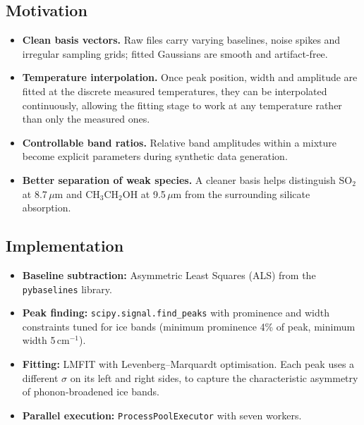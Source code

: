\documentclass[11pt,a4paper]{article}
\newcommand{\um}{\,$\mu$m}
\newcommand{\code}[1]{\texttt{\small #1}}
\begin{document}
\subsection{Motivation}

\begin{itemize}
  \item \textbf{Clean basis vectors.} Raw files carry varying baselines,
        noise spikes and irregular sampling grids; fitted Gaussians are
        smooth and artifact-free.
  \item \textbf{Temperature interpolation.} Once peak position, width and
        amplitude are fitted at the discrete measured temperatures, they
        can be interpolated continuously, allowing the fitting stage to
        work at any temperature rather than only the measured ones.
  \item \textbf{Controllable band ratios.} Relative band amplitudes within
        a mixture become explicit parameters during synthetic data
        generation.
  \item \textbf{Better separation of weak species.} A cleaner basis helps
        distinguish SO$_2$ at 8.7\um{} and CH$_3$CH$_2$OH at 9.5\um{} from
        the surrounding silicate absorption.
\end{itemize}

\subsection{Implementation}

\begin{itemize}
  \item \textbf{Baseline subtraction:} Asymmetric Least Squares (ALS) from
        the \code{pybaselines} library.
  \item \textbf{Peak finding:} \code{scipy.signal.find\_peaks} with
        prominence and width constraints tuned for ice bands (minimum
        prominence 4\% of peak, minimum width 5\,cm$^{-1}$).
  \item \textbf{Fitting:} LMFIT with Levenberg--Marquardt optimisation.
        Each peak uses a different $\sigma$ on its left and right sides, to
        capture the characteristic asymmetry of phonon-broadened ice bands.
  \item \textbf{Parallel execution:} \code{ProcessPoolExecutor} with seven
        workers.
\end{itemize}
\end{document}
